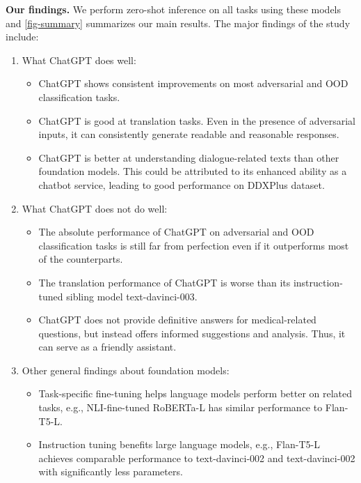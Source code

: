 \documentclass[11pt]{article}
\newcommand{\chat}{ChatGPT\xspace}
\newcommand{\ddx}{DDXPlus\xspace}
\begin{document}
\textbf{Our findings.}
We perform zero-shot inference on all tasks using these models and \cref{fig-summary} summarizes our main results.
The major findings of the study include:
\begin{enumerate}
    \item What \chat does well: 
    \begin{itemize}
        \item \chat shows consistent improvements on most adversarial and OOD classification tasks.
        \item \chat is good at translation tasks. Even in the presence of adversarial inputs, it can consistently generate readable and reasonable responses.
        \item \chat is better at understanding dialogue-related texts than other foundation models. This could be attributed to its enhanced ability as a chatbot service, leading to good performance on \ddx dataset.
    \end{itemize}
    
    \item What \chat does not do well:
    \begin{itemize}
        \item The absolute performance of \chat on adversarial and OOD classification tasks is still far from perfection even if it outperforms most of the counterparts.
        \item The translation performance of \chat is worse than its instruction-tuned sibling model text-davinci-003.
        \item \chat does not provide definitive answers for medical-related questions, but instead offers informed suggestions and analysis. Thus, it can serve as a friendly assistant.
    \end{itemize}


    \item Other general findings about foundation models:
    \begin{itemize}
        \item Task-specific fine-tuning helps language models perform better on related tasks, e.g., NLI-fine-tuned RoBERTa-L has similar performance to Flan-T5-L.
        \item Instruction tuning benefits large language models, e.g., Flan-T5-L achieves comparable performance to text-davinci-002 and text-davinci-002 with significantly less parameters.
    \end{itemize}
        
\end{enumerate}
\end{document}
